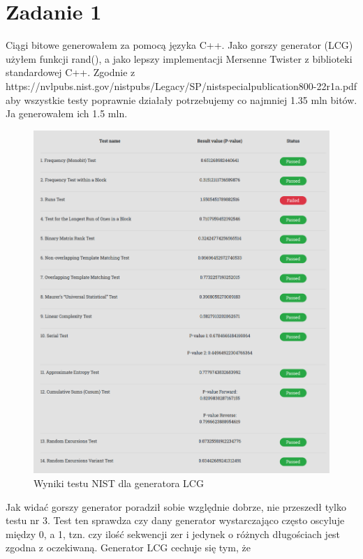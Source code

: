 \documentclass{report}
\begin{document}
\author{Jakub Ogrodowczyk}

\section*{Zadanie 1}
Ciągi bitowe generowałem za pomocą języka C++. Jako gorszy generator (LCG)
użyłem funkcji rand(), a jako lepszy implementacji Mersenne Twister z biblioteki
standardowej C++. Zgodnie z https://nvlpubs.nist.gov/nistpubs/Legacy/SP/nistspecialpublication800-22r1a.pdf
aby wszystkie testy poprawnie działały potrzebujemy co najmniej 1.35 mln bitów.
Ja generowałem ich 1.5 mln.
\begin{figure}[H]
    \centering
    \includegraphics[scale=0.4]{../gorszy_generator.png}
    \caption[Example .]{Wyniki testu NIST dla generatora LCG}
    \label{plotB}
\end{figure}
Jak widać gorszy generator poradził sobie względnie dobrze, nie przeszedł
tylko testu nr 3. Test ten sprawdza czy dany generator wystarczająco często
oscyluje między 0, a 1, tzn. czy ilość sekwencji zer i jedynek o różnych
długościach jest zgodna z oczekiwaną. Generator LCG cechuje się tym, że
\end{document}
